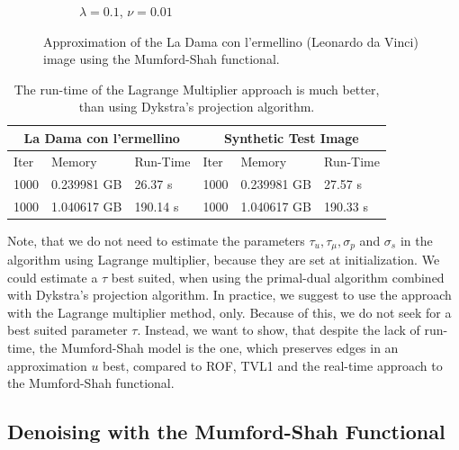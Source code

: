 \documentclass{scrreprt}
\begin{document}
\begin{figure}[!ht]
\begin{subfigure}[b]{0.32\textwidth}
                    \caption{$\lambda = 0.1$, $\nu = 0.01$}
                \end{subfigure}
                \caption[La Dama image approximation with convex relaxed Mumford-Shah.]{Approximation of the La Dama con l'ermellino (Leonardo da Vinci) image using the Mumford-Shah functional.}
            \label{fig:ladama_ms_compare}
            \end{figure}

            \begin{table}[!ht]
                \centering
                \begin{tabular}{| l | l | l | l | l | l |}
                    \hline
                    \multicolumn{3}{|c|}{La Dama con l'ermellino} & \multicolumn{3}{|c|}{Synthetic Test Image} \\ \hline\hline
                    Iter & Memory & Run-Time & Iter & Memory & Run-Time \\ \hline
                    1000 & 0.239981 GB & 26.37 s & 1000 & 0.239981 GB & 27.57 s \\ \hline
                    1000 & 1.040617 GB & 190.14 s & 1000 & 1.040617 GB & 190.33 s \\ \hline
                \end{tabular}
                \caption[Run-Time comparison: Lagrange vs. Dykstra.]{The run-time of the Lagrange Multiplier approach is much better, than using Dykstra's projection algorithm.}
                \label{tab:run_time_compare_lagrange_vs_dykstra}
            \end{table}

            Note, that we do not need to estimate the parameters $\tau_{u}, \tau_{\mu}, \sigma_{p}$ and $\sigma_{s}$ in the algorithm using Lagrange multiplier, because they are set at initialization. We could estimate a $\tau$ best suited, when using the primal-dual algorithm combined with Dykstra's projection algorithm. In practice, we suggest to use the approach with the Lagrange multiplier method, only. Because of this, we do not seek for a best suited parameter $\tau$. Instead, we want to show, that despite the lack of run-time, the Mumford-Shah model is the one, which preserves edges in an approximation $u$ best, compared to ROF, TVL1 and the real-time approach to the Mumford-Shah functional.


        \subsection{Denoising with the Mumford-Shah Functional} %
        \label{sub:denoising_with_the_mumford_shah_functional}
\end{document}
